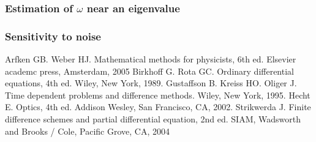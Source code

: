\documentclass[12pt,twoside]{article}
\begin{document}
\subsubsection{Estimation of $\omega$ near an eigenvalue}

\subsubsection{Sensitivity to noise}



\newpage
\begin{thebibliography}{2d}
Arfken GB. Weber HJ. Mathematical methods for physicists, 6th ed. Elsevier academc press, Amsterdam, 2005
Birkhoff G. Rota GC. Ordinary differential equations, 4th ed. Wiley, New York, 1989.
Gustaffson B. Kreiss HO. Oliger J. Time dependent problems and difference methods. Wiley, New York, 1995.
Hecht E. Optics, 4th ed. Addison Wesley, San Francisco, CA, 2002.
Strikwerda J. Finite difference schemes and partial differential equation, 2nd ed. SIAM,  Wadsworth and Brooks / Cole, Pacific Grove, CA, 2004
\end{thebibliography}
\end{document}
